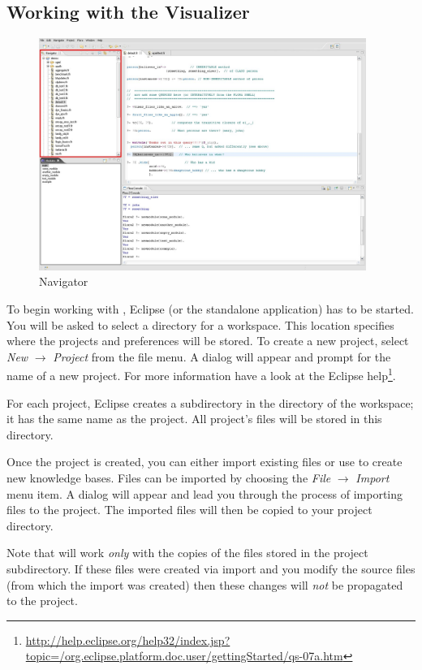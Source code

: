 \subsection{Working with the Visualizer}

\begin{figure}[tbh]
	\centering
		\includegraphics[width=0.95\textwidth]{fviz_navigator}
	\caption{\FVIZ Navigator}
	\label{fig:fviz_navigator}
\end{figure}

To begin working with \FVIZ, Eclipse (or the \FVIZ standalone application)
has to be started. You will be asked to select a directory for a
workspace. This location specifies where the projects and preferences will
be stored.  To create a new project, select
\emph{New} $\rightarrow$ \emph{Project} from the file menu.
A dialog will appear and prompt for
the name of a new project.  For more information have a look at the Eclipse
help\footnote{
  \url{http://help.eclipse.org/help32/index.jsp?topic=/org.eclipse.platform.doc.user/gettingStarted/qs-07a.htm}
}.

For each project, Eclipse creates a subdirectory in the directory of
the workspace; it has the same name as the project. All project's files
will be stored in this directory.

Once the project is created, you can either import existing \FLORA files or
use \FVIZ to create new knowledge bases.
Files can be imported by choosing the
\emph{File} $\rightarrow$ \emph{Import} menu item.
A dialog will appear and lead you through the process of
importing files to the project.
The imported files will then be copied to your project directory.

Note that \FVIZ will work \emph{only} with the copies of the files stored
in the project subdirectory. If these files were created via import and you
modify the source files (from which the import was created)
then these changes will \emph{not} be propagated to
the project.

